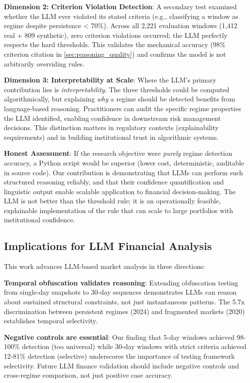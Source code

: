 \textbf{Dimension 2: Criterion Violation Detection}: A secondary test examined whether the LLM ever violated its stated criteria (e.g., classifying a window as regime despite persistence < 70\%). Across all 2,221 evaluation windows (1,412 real + 809 synthetic), zero criterion violations occurred; the LLM perfectly respects the hard thresholds. This validates the mechanical accuracy (98\% criterion citation in \ref{sec:reasoning_quality}) and confirms the model is not arbitrarily overriding rules.

\textbf{Dimension 3: Interpretability at Scale}: Where the LLM's primary contribution lies is \textit{interpretability}. The three thresholds could be computed algorithmically, but explaining \textit{why} a regime should be detected benefits from language-based reasoning. Practitioners can audit the specific regime properties the LLM identified, enabling confidence in downstream risk management decisions. This distinction matters in regulatory contexts (explainability requirements) and in building institutional trust in algorithmic systems.

\textbf{Honest Assessment}: If the research objective were \textit{purely} regime detection accuracy, a Python script would be superior (lower cost, deterministic, auditable in source code). Our contribution is demonstrating that LLMs can perform such structured reasoning reliably, and that their confidence quantification and linguistic output enable scalable application to financial decision-making. The LLM is not better than the threshold rule; it is an operationally feasible, explainable implementation of the rule that can scale to large portfolios with institutional confidence.

\subsection{Implications for LLM Financial Analysis}

This work advances LLM-based market analysis in three directions:

\textbf{Temporal obfuscation validates reasoning}: Extending obfuscation testing from single-day snapshots to 30-day sequences demonstrates LLMs can reason about sustained structural constraints, not just instantaneous patterns. The 5.7x discrimination between persistent regimes (2024) and fragmented markets (2020) establishes temporal selectivity.

\textbf{Negative controls are essential}: Our finding that 5-day windows achieved 98-100\% detection (too universal) while 30-day windows with strict criteria achieved 12-81\% detection (selective) underscores the importance of testing framework selectivity. Future LLM finance validation should include negative controls and cross-regime comparison, not just positive case accuracy.

